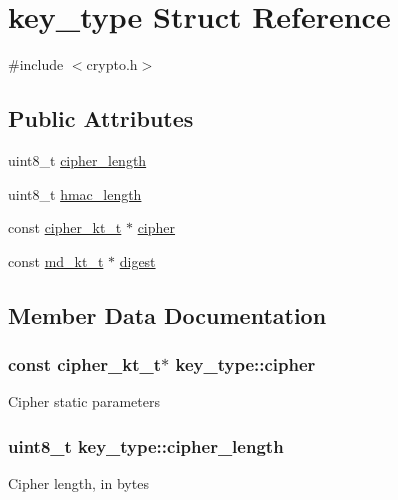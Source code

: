 \hypertarget{structkey__type}{}\section{key\+\_\+type Struct Reference}
\label{structkey__type}


{\ttfamily \#include $<$crypto.\+h$>$}

\subsection*{Public Attributes}
\begin{DoxyCompactItemize}
\item 
uint8\+\_\+t \hyperlink{structkey__type_a24ca445d5f9e33112714deaf58cf3599}{cipher\+\_\+length}
\item 
uint8\+\_\+t \hyperlink{structkey__type_a0714213fa1e02f00924a2c85deb53caf}{hmac\+\_\+length}
\item 
const \hyperlink{crypto__mbedtls_8h_aa82c97683560a0df89eddd2a3cf6e6d4}{cipher\+\_\+kt\+\_\+t} $\ast$ \hyperlink{structkey__type_aba064fbaa853a46ae2d3afbc3ae98aff}{cipher}
\item 
const \hyperlink{crypto__mbedtls_8h_acd12a312c79aead7af792554fb5606d5}{md\+\_\+kt\+\_\+t} $\ast$ \hyperlink{structkey__type_a496ad3263017e1eca30ec7f490a8011e}{digest}
\end{DoxyCompactItemize}


\subsection{Member Data Documentation}
\hypertarget{structkey__type_aba064fbaa853a46ae2d3afbc3ae98aff}{}
\subsubsection[{cipher}]{\setlength{\rightskip}{0pt plus 5cm}const {\bf cipher\+\_\+kt\+\_\+t}$\ast$ key\+\_\+type\+::cipher}\label{structkey__type_aba064fbaa853a46ae2d3afbc3ae98aff}
Cipher static parameters \hypertarget{structkey__type_a24ca445d5f9e33112714deaf58cf3599}{}
\subsubsection[{cipher\+\_\+length}]{\setlength{\rightskip}{0pt plus 5cm}uint8\+\_\+t key\+\_\+type\+::cipher\+\_\+length}\label{structkey__type_a24ca445d5f9e33112714deaf58cf3599}
Cipher length, in bytes \hypertarget{structkey__type_a496ad3263017e1eca30ec7f490a8011e}{}
